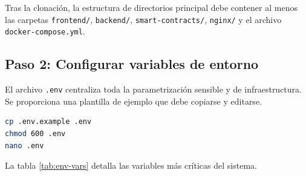 \documentclass[11pt, a4paper]{article}
\begin{document}
Tras la clonaci\'{o}n, la estructura de directorios principal debe contener al menos las carpetas \texttt{frontend/}, \texttt{backend/}, \texttt{smart-contracts/}, \texttt{nginx/} y el archivo \texttt{docker-compose.yml}.

\subsection{Paso 2: Configurar variables de entorno}

El archivo \texttt{.env} centraliza toda la parametrizaci\'{o}n sensible y de infraestructura. Se proporciona una plantilla de ejemplo que debe copiarse y editarse.

\begin{lstlisting}[language=bash, caption={Preparaci\'{o}n del archivo de entorno}]
cp .env.example .env
chmod 600 .env
nano .env
\end{lstlisting}

La tabla \ref{tab:env-vars} detalla las variables m\'{a}s cr\'{i}ticas del sistema.
\end{document}
